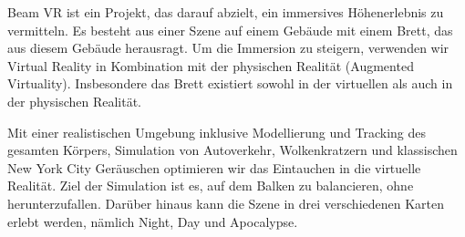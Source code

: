 Beam VR ist ein Projekt, das darauf abzielt, ein immersives Höhenerlebnis zu vermitteln.
Es besteht aus einer Szene auf einem Gebäude mit einem Brett, das aus diesem Gebäude herausragt.
Um die Immersion zu steigern, verwenden wir Virtual Reality in Kombination mit der physischen Realität (Augmented Virtuality).
Insbesondere das Brett existiert sowohl in der virtuellen als auch in der physischen Realität.

Mit einer realistischen Umgebung inklusive Modellierung und Tracking des gesamten Körpers, Simulation von Autoverkehr, Wolkenkratzern und klassischen New York City Geräuschen optimieren wir das Eintauchen in die virtuelle Realität.
Ziel der Simulation ist es, auf dem Balken zu balancieren, ohne herunterzufallen.
Darüber hinaus kann die Szene in drei verschiedenen Karten erlebt werden, nämlich Night, Day und Apocalypse.
